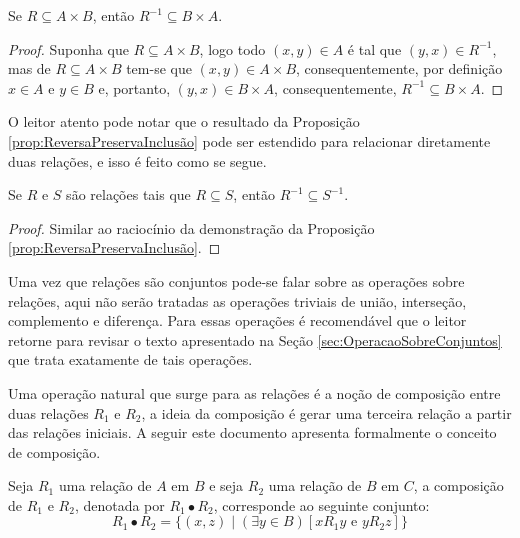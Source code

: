 \begin{proposicao}\label{prop:ReversaPreservaInclusão}
	Se $R \subseteq A \times B$, então $R^{-1} \subseteq B \times A$.
\end{proposicao}

\begin{proof}
	Suponha que $R \subseteq A \times B$, logo todo $(x, y) \in A$ é tal que $(y, x) \in R^{-1}$, mas de $R \subseteq A \times B$ tem-se que $(x, y) \in A \times B$, consequentemente, por definição $x \in A$ e $y \in B$ e, portanto, $(y, x) \in B \times A$, consequentemente, $R^{-1} \subseteq B \times A$.
\end{proof}

O leitor atento pode notar que o resultado da Proposição \ref{prop:ReversaPreservaInclusão} pode ser estendido para relacionar diretamente duas relações, e isso é feito como se segue.

\begin{teorema}\label{teo:ReversaPreservaInclusão}
	Se $R$ e $S$ são relações tais que $R \subseteq S$, então $R^{-1} \subseteq S^{-1}$.
\end{teorema}

\begin{proof}
	Similar ao raciocínio da demonstração da Proposição \ref{prop:ReversaPreservaInclusão}.
\end{proof}

Uma vez que relações são conjuntos pode-se falar sobre as operações sobre relações, aqui não serão tratadas as operações triviais de união, interseção, complemento e diferença. Para essas operações é recomendável que o leitor retorne para revisar o texto apresentado na Seção \ref{sec:OperacaoSobreConjuntos} que trata exatamente de tais operações. 

Uma operação natural que surge para as relações é a noção de composição entre duas relações $R_1$ e $R_2$, a ideia da composição é gerar uma terceira relação a partir das relações iniciais. A seguir este documento apresenta formalmente o conceito de composição.

\begin{definicao}\label{def:ComposicaoRelacoes}
	Seja $R_1$ uma relação de $A$ em $B$ e seja $R_2$ uma relação de $B$ em $C$, a composição de $R_1$ e $R_2$, denotada por $R_1 \bullet R_2$, corresponde ao seguinte conjunto:
	$$R_1 \bullet R_2 = \{(x, z) \mid (\exists y \in B)[x\mathrel{R_1}y \text{ e } y\mathrel{R_2}z] \}$$
\end{definicao}

